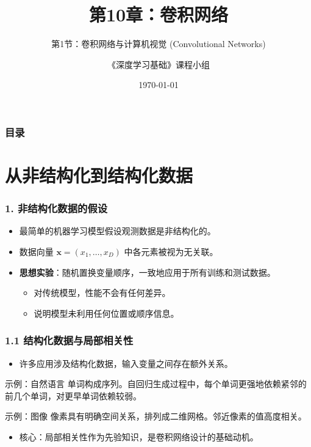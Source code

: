 \documentclass[t,aspectratio=169]{beamer} %
\title[10.1.卷积网络]{第10章：卷积网络}
\subtitle{第1节：卷积网络与计算机视觉 (Convolutional Networks)}
\author{《深度学习基础》课程小组}
\date{\today}
\begin{document}
\frame{\titlepage}

\begin{frame}
    \frametitle{目录}
    \tableofcontents
\end{frame}

\section{从非结构化到结构化数据}

\begin{frame}
    \frametitle{1. 非结构化数据的假设}
    \begin{itemize}
        \item 最简单的机器学习模型假设观测数据是\alert{非结构化}的。
        \item 数据向量 $\mathbf{x} = (x_1, \dots, x_D)$ 中各元素被视为\alert{无关联}。
        \item \textbf{思想实验}：随机置换变量顺序，一致地应用于所有训练和测试数据。
        \begin{itemize}
            \item 对传统模型，性能\alert{不会有任何差异}。
            \item 说明模型\alert{未利用任何位置或顺序信息}。
        \end{itemize}
    \end{itemize}
\end{frame}

\begin{frame}
    \frametitle{1.1 结构化数据与局部相关性}
    \begin{itemize}
        \item 许多应用涉及\alert{结构化数据}，输入变量之间存在额外关系。
    \end{itemize}
    \begin{block}{示例：自然语言}
        单词构成\alert{序列}。自回归生成过程中，每个单词更强地依赖\alert{紧邻的前几个单词}，对更早单词依赖较弱。
    \end{block}
    \begin{block}{示例：图像}
        像素具有明确\alert{空间关系}，排列成二维网格。\alert{邻近像素的值高度相关}。
    \end{block}
    \begin{itemize}
        \item 核心：\alert{局部相关性}作为先验知识，是卷积网络设计的基础动机。
    \end{itemize}
\end{frame}
\end{document}
